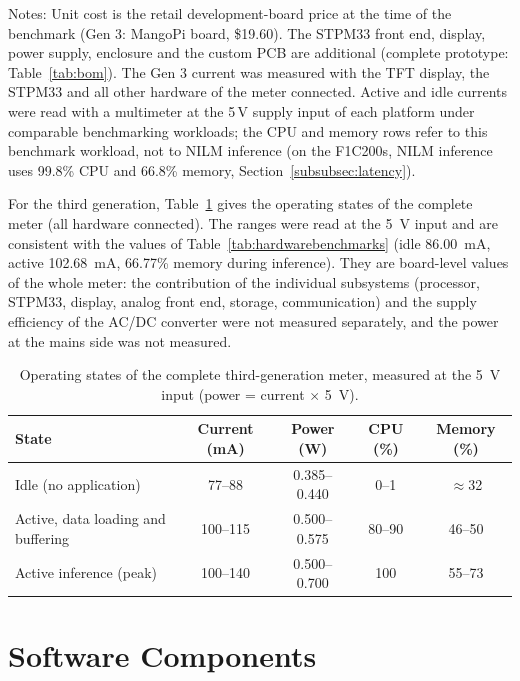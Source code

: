 \documentclass[fleqn,10pt]{wlscirep}
\begin{document}
\begin{table}[!t]
\begin{tabular}{lcccc}
\end{tabular}\par\smallskip\parbox{\linewidth}{\footnotesize Notes: Unit cost is the retail development-board price at the time of the benchmark (Gen 3: MangoPi board, \$19.60). The STPM33 front end, display, power supply, enclosure and the custom PCB are additional (complete prototype: Table~\ref{tab:bom}). The Gen 3 current was measured with the TFT display, the STPM33 and all other hardware of the meter connected. Active and idle currents were read with a multimeter at the 5\,V supply input of each platform under comparable benchmarking workloads; the CPU and memory rows refer to this benchmark workload, not to NILM inference (on the F1C200s, NILM inference uses 99.8\% CPU and 66.8\% memory, Section~\ref{subsubsec:latency}).}
\end{table}

For the third generation, Table~\ref{tab:power_states} gives the operating states of the complete meter (all hardware connected). The ranges were read at the 5~V input and are consistent with the values of Table~\ref{tab:hardwarebenchmarks} (idle 86.00~mA, active 102.68~mA, 66.77\% memory during inference). They are board-level values of the whole meter: the contribution of the individual subsystems (processor, STPM33, display, analog front end, storage, communication) and the supply efficiency of the AC/DC converter were not measured separately, and the power at the mains side was not measured.

\begin{table}[!t]
\centering
\caption{Operating states of the complete third-generation meter, measured at the 5~V input (power = current $\times$ 5~V).}
\label{tab:power_states}
\footnotesize
\begin{tabular}{@{}p{2.3cm}cccc@{}}
\toprule
State & Current (mA) & Power (W) & CPU (\%) & Memory (\%) \\
\midrule
Idle (no application) & 77--88 & 0.385--0.440 & 0--1 & $\approx$32 \\
Active, data loading and buffering & 100--115 & 0.500--0.575 & 80--90 & 46--50 \\
Active inference (peak) & 100--140 & 0.500--0.700 & 100 & 55--73 \\
\bottomrule
\end{tabular}
\end{table}

\section{Software Components}
\label{sec:software}
\end{document}
